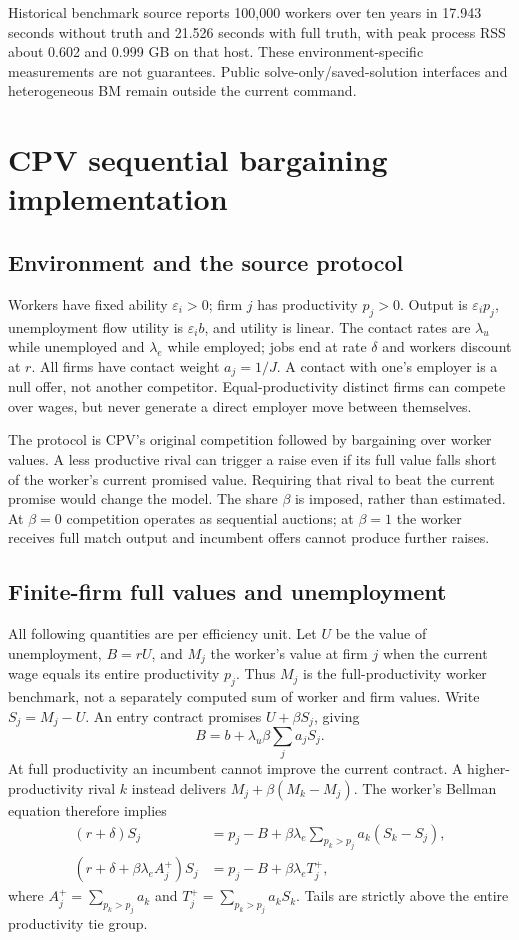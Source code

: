 \documentclass[11pt,letterpaper]{article}
\newcommand{\code}[1]{\texttt{\detokenize{#1}}}
\begin{document}
Historical benchmark source \code{f936f0a} reports 100,000 workers over
ten years in 17.943 seconds without truth and 21.526 seconds with full
truth, with peak process RSS about 0.602 and 0.999 GB on that host.
These environment-specific measurements are not guarantees.
Public solve-only/saved-solution interfaces and heterogeneous BM remain
outside the current command.

\section{CPV sequential bargaining implementation}\label{app:cpv}
\subsection{Environment and the source protocol}
Workers have fixed ability $\varepsilon_i>0$; firm $j$ has productivity
$p_j>0$. Output is $\varepsilon_i p_j$, unemployment flow utility is
$\varepsilon_i b$, and utility is linear. The contact rates are
$\lambda_u$ while unemployed and $\lambda_e$ while employed; jobs end
at rate $\delta$ and workers discount at $r$. All firms have contact
weight $a_j=1/J$. A contact with one's employer is a null offer, not
another competitor. Equal-productivity distinct firms can compete over
wages, but never generate a direct employer move between themselves.

The protocol is CPV's original competition followed by bargaining over
worker values. A less productive rival can trigger a raise even if its
full value falls short of the worker's current promised value. Requiring
that rival to beat the current promise would change the model. The share
$\beta$ is imposed, rather than estimated. At $\beta=0$ competition
operates as sequential auctions; at $\beta=1$ the worker receives full
match output and incumbent offers cannot produce further raises.

\subsection{Finite-firm full values and unemployment}
All following quantities are per efficiency unit. Let $U$ be the value of
unemployment, $B=rU$, and $M_j$ the worker's value at firm $j$ when the
current wage equals its entire productivity $p_j$. Thus $M_j$ is the
full-productivity worker benchmark, not a separately computed sum of
worker and firm values. Write $S_j=M_j-U$. An entry contract promises
$U+\beta S_j$, giving
\begin{equation}\label{eq:cpvU}
 B=b+\lambda_u\beta\sum_j a_j S_j.
\end{equation}
At full productivity an incumbent cannot improve the current contract.
A higher-productivity rival $k$ instead delivers $M_j+\beta(M_k-M_j)$.
The worker's Bellman equation therefore implies
\begin{align}
 (r+\delta)S_j
 &=p_j-B+\beta\lambda_e\sum_{p_k>p_j}a_k(S_k-S_j),\\
 (r+\delta+\beta\lambda_e A_j^+)S_j
 &=p_j-B+\beta\lambda_e T_j^+,\label{eq:cpvS}
\end{align}
where $A_j^+=\sum_{p_k>p_j}a_k$ and
$T_j^+=\sum_{p_k>p_j}a_kS_k$. Tails are strictly above the entire
productivity tie group.
\end{document}
